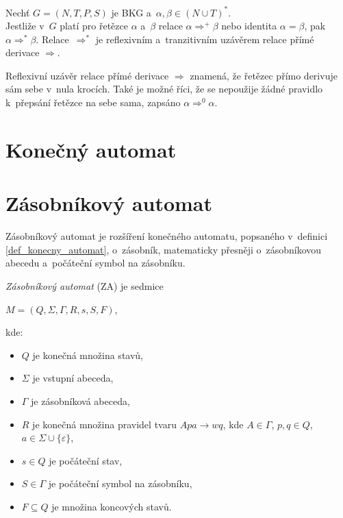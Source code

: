 \begin{definition}\label{def_refl_uzaver}
    Nechť $G = (N, T, P, S)$ je BKG a~$\alpha, \beta \in (N \cup T)^*$. \\
    Jestliže v~$G$ platí pro řetězce $\alpha$ a~$\beta$ relace $\alpha \Rightarrow^+ \beta$ nebo identita $\alpha = \beta$, pak $\alpha \Rightarrow^* \beta$.
    Relace~$\Rightarrow^*$ je reflexivním a~tranzitivním uzávěrem relace přímé derivace $\Rightarrow$.  
\end{definition}
Reflexivní uzávěr relace přímé derivace $\Rightarrow$ znamená, že řetězec přímo derivuje sám sebe v~nula krocích.
Také je možné říci, že se nepoužije žádné pravidlo k~přepsání řetězce na sebe sama, zapsáno $\alpha \Rightarrow^0 \alpha$.


\section{Konečný automat}
\begin{definition}\label{def_konecny_automat}
    
\end{definition}

\section{Zásobníkový automat}\label{kap_zasobnikovy_automat}
Zásobníkový automat je rozšíření konečného automatu, popsaného v~definici \ref{def_konecny_automat}, o~zásobník, matematicky přesněji o~zásobníkovou abecedu a~počáteční symbol na zásobníku.
\begin{definition}\label{def_zasobnikovy_automat}
    \emph{Zásobníkový automat} (ZA) je sedmice 
    \begin{center}
        $M = (Q, \Sigma, \Gamma, R, s, S, F)$,
    \end{center}
    kde:
    \begin{itemize}
        \item $Q$ je konečná množina stavů,
        \item $\Sigma$ je vstupní abeceda,
        \item $\Gamma$ je zásobníková abeceda,
        \item $R$ je konečná množina pravidel tvaru $Apa \rightarrow wq$, kde $A \in \Gamma$, $p,q \in Q$, $a \in \Sigma \cup \{\varepsilon\}$,  
        \item $s \in Q$ je počáteční stav, 
        \item $S \in \Gamma$ je počáteční symbol na zásobníku,
        \item $F \subseteq Q$ je množina koncových stavů.
    \end{itemize}
\end{definition}


